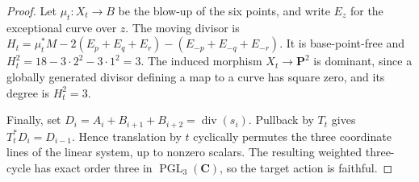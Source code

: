\documentclass[10pt,a4paper]{amsart}
\newcommand{\C}{\mathbf C}
\newcommand{\PP}{\mathbf P}
\newcommand{\divisor}{\operatorname{div}}
\begin{document}
\begin{proof}
Let $\mu_t:X_t\to B$ be the blow-up of the six points, and write $E_z$
for the exceptional curve over $z$.  The moving divisor is
$H_t=\mu_t^*M-2(E_p+E_q+E_r)
-(E_{-p}+E_{-q}+E_{-r})$.  It is base-point-free and
$H_t^2=18-3\cdot2^2-3\cdot1^2=3$.
The induced morphism $X_t\to\PP^2$ is dominant, since a globally generated
divisor defining a map to a curve has square zero, and its degree is
$H_t^2=3$.

Finally, set $D_i=A_i+B_{i+1}+B_{i+2}=\divisor(s_i)$.
Pullback by $T_t$ gives $T_t^*D_i=D_{i-1}$.  Hence translation by $t$
cyclically permutes the three coordinate lines of the linear system, up to nonzero
scalars.  The resulting weighted three-cycle has exact order three in
$\operatorname{PGL}_3(\C)$, so the target action is faithful.
\end{proof}
\end{document}

